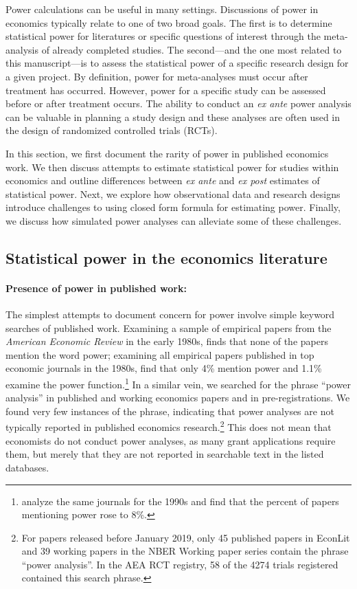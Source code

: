 \documentclass[12pt]{article}%
\begin{document}
Power calculations can be useful in many settings.
Discussions of power in economics typically relate to one of two broad goals. 
The first is to determine statistical power for literatures or specific questions of interest through the meta-analysis of already completed studies. 
The second---and the one most related to this manuscript---is to assess the statistical power of a specific research design for a given project.  
By definition, power for meta-analyses must occur after treatment has occurred. 
However, power for a specific study can be assessed before or after treatment occurs.  
The ability to conduct an \emph{ex ante} power analysis can be valuable in planning a study design and these analyses are often used in the design of randomized controlled trials (RCTs). 

In this section, we first document the rarity of power in published economics work. 
We then discuss attempts to estimate statistical power for studies within economics and outline differences between \emph{ex ante} and \emph{ex post} estimates of statistical power.
Next, we explore how observational data  and research designs introduce challenges to using closed form formula for estimating power. 
Finally, we discuss how simulated power analyses can alleviate some of these challenges.

 
\subsection{Statistical power in the economics literature}

\paragraph{Presence of power in published work:} The simplest attempts to document concern for power involve simple keyword searches of published work.  
Examining a sample of empirical papers from the \emph{American Economic Review} in the early 1980s, \citet{Mccloskey1985} finds that none of the papers mention the word power; examining all empirical papers published in top economic journals in the 1980s, \citet{Mccloskey1996} find that only 4\% mention power and 1.1\% examine the power function.\footnote{\citet{Ziliak2004} analyze the same journals for the 1990s and find that the percent of papers mentioning power rose to 8\%.}
In a similar vein, we searched for the phrase ``power analysis'' in published and working economics papers and in pre-registrations. 
We found very few instances of the phrase, indicating that power analyses are not typically reported in published economics research.\footnote{For papers released before January 2019, only 45 published papers in EconLit and 39 working papers in the NBER Working paper series contain the phrase ``power analysis''. In the AEA RCT registry, 58 of the 4274 trials registered contained this search phrase.}
This does not mean that economists do not conduct power analyses, as many grant applications require them, but merely that they are not reported in searchable text in the listed databases. 
\end{document}
